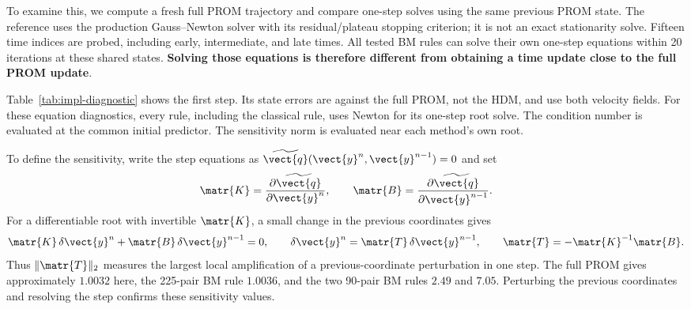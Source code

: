 To examine this, we compute a fresh full PROM trajectory and compare one-step solves using the same previous PROM state. The reference uses the production Gauss--Newton solver with its residual/plateau stopping criterion; it is not an exact stationarity solve. Fifteen time indices are probed, including early, intermediate, and late times. All tested BM rules can solve their own one-step equations within 20 iterations at these shared states. \textbf{Solving those equations is therefore different from obtaining a time update close to the full PROM update}.

Table~\ref{tab:impl-diagnostic} shows the first step. Its state errors are against the full PROM, not the HDM, and use both velocity fields. For these equation diagnostics, every rule, including the classical rule, uses Newton for its one-step root solve. The condition number is evaluated at the common initial predictor. The sensitivity norm is evaluated near each method's own root.

\begin{table}[H]
 \centering\small
 
 \caption{First-step diagnostic at $\vect{\mu}=(4.56,0.019)$ using a shared previous PROM state. $\matr{K}$ is the derivative of the reduced equations; $\matr{T}$ is the local derivative of the implicit time update. The classical row uses the earlier 90-pair rule, not the 2492-cell benchmark rule.}
 \label{tab:impl-diagnostic}
\end{table}

To define the sensitivity, write the step equations as $\widetilde{\vect{q}}(\vect{y}^n,\vect{y}^{n-1})=0$ and set
\begin{equation}
 \matr{K}=\frac{\partial\widetilde{\vect{q}}}{\partial \vect{y}^n},\qquad
 \matr{B}=\frac{\partial\widetilde{\vect{q}}}{\partial \vect{y}^{n-1}}.
\end{equation}
For a differentiable root with invertible $\matr{K}$, a small change in the previous coordinates gives
\begin{equation}
 \matr{K}\,\delta \vect{y}^n+\matr{B}\,\delta \vect{y}^{n-1}=0,
 \qquad
 \delta \vect{y}^n=\matr{T}\,\delta \vect{y}^{n-1},\qquad \matr{T}=-\matr{K}^{-1}\matr{B}.
 \label{eq:impl-sensitivity}
\end{equation}
Thus $\|\matr{T}\|_2$ measures the largest local amplification of a previous-coordinate perturbation in one step. The full PROM gives approximately $1.0032$ here, the 225-pair BM rule $1.0036$, and the two 90-pair BM rules $2.49$ and $7.05$. Perturbing the previous coordinates and resolving the step confirms these sensitivity values.

